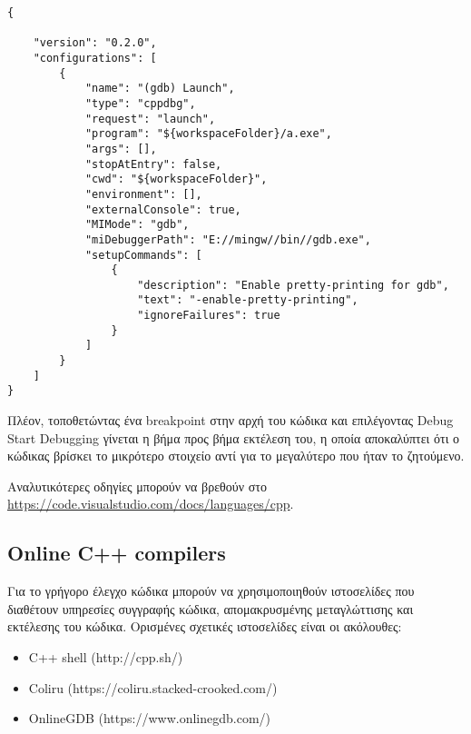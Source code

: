 \begin{enumerate}
\begin{lstlisting}[style=DOS,caption=launch.json]
{

    "version": "0.2.0",
    "configurations": [
        {
            "name": "(gdb) Launch",
            "type": "cppdbg",
            "request": "launch",
            "program": "${workspaceFolder}/a.exe",
            "args": [],
            "stopAtEntry": false,
            "cwd": "${workspaceFolder}",
            "environment": [],
            "externalConsole": true,
            "MIMode": "gdb",
            "miDebuggerPath": "E://mingw//bin//gdb.exe",
            "setupCommands": [
                {
                    "description": "Enable pretty-printing for gdb",
                    "text": "-enable-pretty-printing",
                    "ignoreFailures": true
                }
            ]
        }
    ]
}
\end{lstlisting}

Πλέον, τοποθετώντας ένα breakpoint στην αρχή του κώδικα και επιλέγοντας Debug \textrightarrow Start Debugging γίνεται η βήμα προς βήμα εκτέλεση του, η οποία αποκαλύπτει ότι ο κώδικας βρίσκει το μικρότερο στοιχείο αντί για το μεγαλύτερο που ήταν το ζητούμενο. 

\end{enumerate}

Αναλυτικότερες οδηγίες μπορούν να βρεθούν στο \href{https://code.visualstudio.com/docs/languages/cpp}{https://code.visualstudio.com/docs/languages/cpp}.

%

\subsection*{Online C++ compilers}
Για το γρήγορο έλεγχο κώδικα μπορούν να χρησιμοποιηθούν ιστοσελίδες που διαθέτουν υπηρεσίες συγγραφής κώδικα, απομακρυσμένης μεταγλώττισης και εκτέλεσης του κώδικα. Ορισμένες σχετικές ιστοσελίδες είναι οι ακόλουθες:
\begin{itemize}
\item C++ shell (http://cpp.sh/)
\item Coliru (https://coliru.stacked-crooked.com/)
\item OnlineGDB (https://www.onlinegdb.com/)
\end{itemize}  


